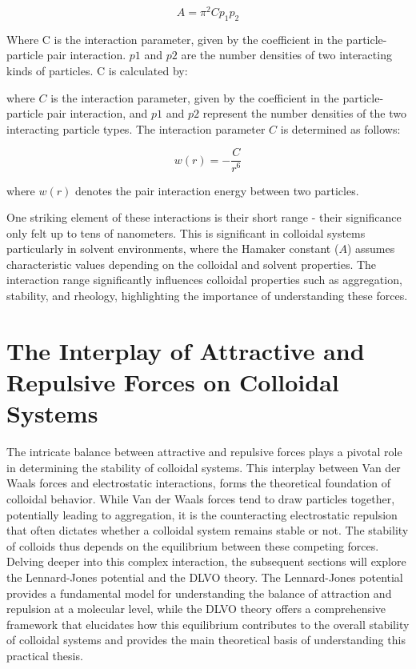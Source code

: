 \begin{equation} %
A = \pi^2 C p_1 p_2
\end{equation}

Where C is the interaction parameter, given by the coefficient in the particle-particle pair interaction. $p1$ and $p2$ are the number densities of two interacting kinds of particles.\cite{?} C is calculated by:

where \(C\) is the interaction parameter, given by the coefficient in the particle-particle pair interaction, and \(p1\) and \(p2\) represent the number densities of the two interacting particle types. \cite{FoundColloidBook} The interaction parameter \(C\) is determined as follows:


\begin{equation}
w(r) = - \frac{C}{r^6}
\end{equation}

where \(w(r)\) denotes the pair interaction energy between two particles. 

One striking element of these interactions is their short range - their significance only felt up to tens of nanometers. This is significant in colloidal systems particularly in solvent environments, where the Hamaker constant (\(A\)) assumes characteristic values depending on the colloidal and solvent properties. The interaction range significantly influences colloidal properties such as aggregation, stability, and rheology, highlighting the importance of understanding these forces.\cite{?} %

\section{The Interplay of Attractive and Repulsive Forces on Colloidal Systems}

The intricate balance between attractive and repulsive forces plays a pivotal role in determining the stability of colloidal systems. This interplay between Van der Waals forces and electrostatic interactions, forms the theoretical foundation of colloidal behavior. While Van der Waals forces tend to draw particles together, potentially leading to aggregation, it is the counteracting electrostatic repulsion that often dictates whether a colloidal system remains stable or not. The stability of colloids thus depends on the equilibrium between these competing forces. Delving deeper into this complex interaction, the subsequent sections will explore the Lennard-Jones potential and the DLVO theory. The Lennard-Jones potential provides a fundamental model for understanding the balance of attraction and repulsion at a molecular level, while the DLVO theory offers a comprehensive framework that elucidates how this equilibrium contributes to the overall stability of colloidal systems and provides the main theoretical basis of understanding this practical thesis.

